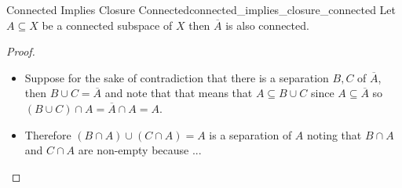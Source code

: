 \begin{proposition}{Connected Implies Closure Connected}{connected_implies_closure_connected}
    Let $ A \subseteq X $ be a connected subspace of $ X $ then $ \overline{A}  $ is also connected.
\end{proposition}
\begin{proof}
    \begin{itemize}
        \item Suppose for the sake of contradiction that there is a separation $ B, C $  of $ \overline{A}  $, then $  B \cup  C =  \overline{A}  $ and note that that means that $ A \subseteq B \cup  C $ since $ A \subseteq \overline{A}  $  so $ \left( B \cup C \right) \cap  A =  \overline{A}  \cap  A =  A $. 
        \item Therefore $ \left( B \cap A \right) \cup  \left( C \cap  A \right) =  A$ is a separation of $ A $ noting that $ B \cap A $ and $ C \cap A $ are non-empty because ...
    \end{itemize}
\end{proof}

